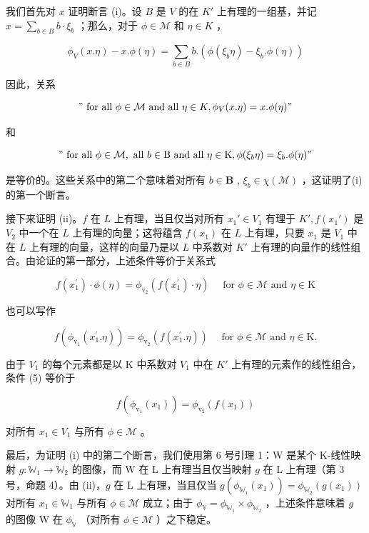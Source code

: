 我们首先对 \(x\) 证明断言 (i)。设 \(B\) 是 \(V\) 的在 \(K'\) 上有理的一组基，并记 \(x = \sum_{b \in B} b \cdot \xi_b\) ；那么，对于 \(\phi \in \mathcal{M}\) 和 \(\eta \in K\) ，

\[
\phi_ {V} (x. \eta) - x. \phi (\eta) = \sum_ {b \in B} b. (\phi (\xi_ {b} \eta) - \xi_ {b}. \phi (\eta))
\]

因此，关系

\[
" \text { for   all } \phi \in \mathcal {M} \text { and   all } \eta \in K, \phi_ {V} (x. \eta) = x. \phi (\eta)"
\]

和

\[
" \text { for   all } \phi \in \mathcal {M}, \text { all } b \in \mathrm{B} \text { and   all } \eta \in \mathrm{K}, \phi (\xi_ {b} \eta) = \xi_ {b}. \phi (\eta)"
\]

是等价的。这些关系中的第二个意味着对所有 \(b \in \mathbf{B}\) , \(\xi_b \in \chi(\mathcal{M})\) ，这证明了(i)的第一个断言。

接下来证明 (ii)。\(f\) 在 \(L\) 上有理，当且仅当对所有 \(x_1' \in V_1\) 有理于 \(K', f(x_1')\) 是 \(V_2\) 中一个在 \(L\) 上有理的向量；这将蕴含 \(f(x_1)\) 在 \(L\) 上有理，只要 \(x_1\) 是 \(V_1\) 中在 \(L\) 上有理的向量，这样的向量乃是以 \(L\) 中系数对 \(K'\) 上有理的向量作的线性组合。由论证的第一部分，上述条件等价于关系式

\[
f (x _ {1} ^ {\prime}) \cdot \phi (\eta) = \phi_ {\mathrm{v} _ {2}} (f (x _ {1} ^ {\prime}) \cdot \eta) \quad \text { for } \phi \in \mathcal {M} \text { and } \eta \in \mathrm{K}\tag{4}
\]

也可以写作

\[
f (\phi_ {\mathrm{v} _ {1}} (x _ {1} ^ {\prime}. \eta)) = \phi_ {\mathrm{v} _ {2}} (f (x _ {1} ^ {\prime}. \eta)) \quad \text { for } \phi \in \mathcal {M} \text { and } \eta \in \mathrm{K}.\tag{5}
\]

由于 \(V_{1}\) 的每个元素都是以 K 中系数对 \(V_{1}\) 中在 \(K'\) 上有理的元素作的线性组合，条件 (5) 等价于

\[
f (\phi_ {\mathrm{v} _ {1}} (x _ {1})) = \phi_ {\mathrm{v} _ {2}} (f (x _ {1}))
\]

对所有 \(x_{1} \in V_{1}\) 与所有 \(\phi \in \mathcal{M}\) 。

最后，为证明 (i) 中的第二个断言，我们使用第 6 号引理 1：W 是某个 K-线性映射 \(g \colon \mathbb{W}_1 \to \mathbb{W}_2\) 的图像，而 W 在 L 上有理当且仅当映射 \(g\) 在 L 上有理（第 3 号，命题 4）。由 (ii)，\(g\) 在 L 上有理，当且仅当 \(g(\phi_{\mathbb{W}_1}(x_1)) = \phi_{\mathbb{W}_2}(g(x_1))\) 对所有 \(x_1 \in \mathbb{W}_1\) 与所有 \(\phi \in \mathcal{M}\) 成立；由于 \(\phi_{\mathbb{V}} = \phi_{\mathbb{W}_1} \times \phi_{\mathbb{W}_2}\) ，上述条件意味着 \(g\) 的图像 W 在 \(\phi_{\mathbb{V}}\) （对所有 \(\phi \in \mathcal{M}\) ）之下稳定。

